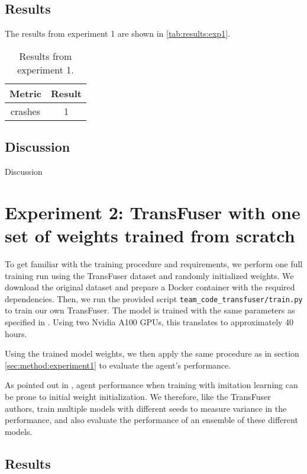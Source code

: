 \subsection{Results}

The results from experiment 1 are shown in \autoref{tab:results:exp1}.

\begin{table}[]
    \centering
    \begin{tabular}{c|c}
        \textbf{Metric} & \textbf{Result} \\ \hline
        crashes & 1
    \end{tabular}
    \caption{Results from experiment 1.}
    \label{tab:results:exp1}
\end{table}


\subsection{Discussion}

Discussion


\section{Experiment 2: TransFuser with one set of weights trained from scratch}
\label{sec:experiment2}

To get familiar with the training procedure and requirements,
we perform one full training run using the TransFuser dataset and randomly initialized weights.
We download the original dataset and prepare a Docker container with the required dependencies.
Then, we run the provided script \texttt{team\_code\_transfuser/train.py} to train our own TransFuser.
The model is trained with the same parameters as specified in \cite{transfuser-pami}.
Using two Nvidia A100 GPUs, this translates to approximately 40 hours.

Using the trained model weights,
we then apply the same procedure as in section \ref{sec:method:experiment1}
to evaluate the agent's performance.

As pointed out in \cite{transfuser-pami},
agent performance when training with imitation learning
can be prone to initial weight initialization.
We therefore, like the TransFuser authors,
train multiple models with different seeds to measure variance in the performance,
and also evaluate the performance of an ensemble of these different models.


\subsection{Results}

